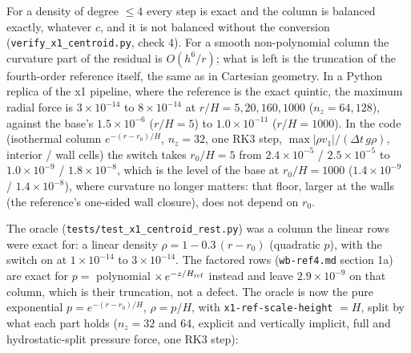 \documentclass[11pt,a4paper]{article}
\begin{document}
For a density of degree $\le 4$ every step is exact and the column is balanced exactly, whatever $c$, and it
is not balanced without the conversion (\texttt{verify\_x1\_centroid.py}, check 4). For a smooth non-polynomial column
the curvature part of the residual is $O(h^6/r)$; what is left is the truncation of the fourth-order reference
itself, the same as in Cartesian geometry. In a Python replica of the x1 pipeline, where the reference is the
exact quintic, the maximum radial force is $3\times10^{-14}$ to $8\times10^{-14}$ at $r/H = 5, 20, 160, 1000$
($n_z = 64, 128$), against the base's $1.5\times10^{-6}$ ($r/H = 5$) to $1.0\times10^{-11}$ ($r/H = 1000$). In
the code (isothermal column $e^{-(r - r_0)/H}$, $n_z = 32$, one RK3 step, $\max|\rho v_1|/(\Delta t\,g\rho)$,
interior / wall cells) the switch takes $r_0/H = 5$ from $2.4\times10^{-5}$ / $2.5\times10^{-5}$ to
$1.0\times10^{-9}$ / $1.8\times10^{-8}$, which is the level of the base at $r_0/H = 1000$
($1.4\times10^{-9}$ / $1.4\times10^{-8}$), where curvature no longer matters: that floor, larger at the walls
(the reference's one-sided wall closure), does not depend on $r_0$.

The oracle (\texttt{tests/test\_x1\_centroid\_rest.py}) was a column the linear rows were exact for: a linear density
$\rho = 1 - 0.3\,(r - r_0)$ (quadratic $p$), with the switch on at $1\times10^{-14}$ to $3\times10^{-14}$. The
factored rows (\texttt{wb-ref4.md} section 1a) are exact for $p = $ polynomial $\times\,e^{-z/H_{\rm ref}}$ instead and leave
$2.9\times10^{-9}$ on that column, which is their truncation, not a defect. The oracle is now the pure
exponential $p = e^{-(r - r_0)/H}$, $\rho = p/H$, with \texttt{x1-ref-scale-height} $= H$, split by what each part
holds ($n_z = 32$ and 64, explicit and vertically implicit, full and hydrostatic-split pressure force, one RK3
step):
\end{document}
